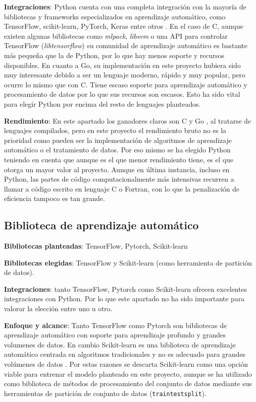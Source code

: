 \textbf{Integraciones}: Python cuenta con una completa integración con la mayoría de bibliotecas y frameworks especializados en aprendizaje automático, como TensorFlow, scikit-learn, PyTorch, Keras entre otros \cite{Team_2023}.
En el caso de C, aunque existen algunas bibliotecas como \textit{mlpack}, \textit{libsvm} o una API para controlar TensorFlow (\textit{libtensorflow}) su comunidad de aprendizaje automático es bastante más pequeña que la de Python, por lo que hay menos soporte y recursos disponibles.
En cuanto a Go, su implementación en este proyecto hubiera sido muy interesante debido a ser un lenguaje moderno, rápido y muy popular, pero ocurre lo mismo que con C. Tiene escaso soporte para aprendizaje automático y procesamiento de datos por lo que sus recursos son escasos.
Esto ha sido vital para elegir Python por encima del resto de lenguajes planteados.

\textbf{Rendimiento}: En este apartado los ganadores claros son C y Go \cite{Python3vsC}, al tratarse de lenguajes compilados, pero en este proyecto el rendimiento bruto no es la prioridad como pueden ser la implementación de algoritmos de aprendizaje automático o el tratamiento de datos.
Por eso mismo se ha elegido Python teniendo en cuenta que aunque es el que menor rendimiento tiene, es el que otorga un mayor valor al proyecto. Aunque en última instancia, incluso en Python, las partes de código computacionalmente más intensivas recurren a llamar a código escrito en lenguaje C o Fortran, con lo que la penalización de eficiencia tampoco es tan grande.

\subsection{Biblioteca de aprendizaje automático}

\textbf{Bibliotecas planteadas}: TensorFlow, Pytorch, Scikit-learn

\textbf{Bibliotecas elegidas}: TensorFlow y Scikit-learn (como herramienta de partición de datos).

\textbf{Integraciones}: tanto TensorFlow, Pytorch como Scikit-learn ofrecen excelentes integraciones con Python. Por lo que este apartado no ha sido importante para valorar la elección entre uno u otro.

\textbf{Enfoque y alcance}: Tanto TensorFlow como Pytorch son bibliotecas de aprendizaje automático con soporte para aprendizaje profundo y grandes volumenes de datos. En cambio Scikit-learn es una biblioteca de aprendizaje automático centrada en algoritmos tradicionales y no es adecuado para grandes volúmenes de datos \cite{Loobuyck_2020}.
Por estas razones se descarta Scikit-learn como una opción viable para entrenar el modelo planteado en este proyecto, aunque se ha utilizado como biblioteca de métodos de procesamiento del conjunto de datos mediante sus herramientas de partición de conjunto de datos (\texttt{train\textunderscore test\textunderscore split}).


